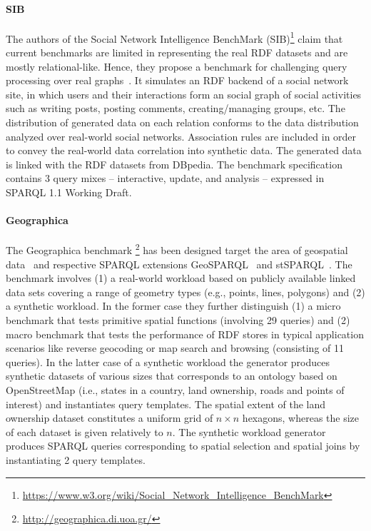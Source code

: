 \paragraph{SIB} The authors of the Social Network Intelligence BenchMark (SIB)\footnote{\url{https://www.w3.org/wiki/Social_Network_Intelligence_BenchMark}} claim that current benchmarks are limited in representing the real RDF datasets and are mostly relational-like. Hence, they propose a benchmark for challenging query processing over real graphs~\cite{sib}. It simulates an RDF backend of a social network site, in which users and their interactions form an social graph of social activities such as writing posts, posting comments, creating/managing groups, etc. The distribution of generated data on each relation conforms to the data distribution analyzed over real-world social networks. Association rules are included in order to convey the real-world data correlation into synthetic data. The  generated data is linked with the RDF datasets from DBpedia. The benchmark specification contains 3 query mixes -- interactive, update, and analysis -- expressed in SPARQL 1.1 Working Draft.

\paragraph{Geographica} The Geographica benchmark \footnote{\url{http://geographica.di.uoa.gr/}} has been designed target the area of geospatial data~\cite{DBLP:conf/semweb/GarbisKK13} and respective SPARQL extensions GeoSPARQL~\cite{battle2012enabling} and stSPARQL~\cite{koubarakis2010modeling}. The benchmark involves (1) a real-world workload based on publicly available linked data sets covering a range of geometry types (e.g., points, lines, polygons) and (2) a synthetic workload. In the former case they further distinguish (1) a micro benchmark that tests primitive spatial functions (involving 29 queries) and (2) macro benchmark that tests the performance of RDF stores in typical application scenarios like reverse geocoding or map search and browsing (consisting of 11 queries). In the latter case of a synthetic workload the generator produces synthetic datasets of various sizes that corresponds to an ontology based on OpenStreetMap (i.e., states in a country, land ownership, roads and  points of interest) and instantiates query templates. The spatial extent of the land ownership dataset constitutes a uniform grid of $n \times n$ hexagons, whereas the size of each dataset is given relatively to $n$. The synthetic workload generator produces SPARQL queries corresponding to spatial selection and spatial joins by instantiating 2 query templates.


